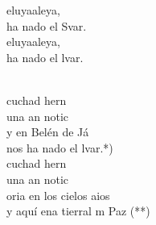 \documentclass[12pt]{article}
\begin{document}
\begin{multicols*}{2}
\begin{cancion}%
	\begin{chorus}%
	eluyaaleya,\\
	ha nado el Svar.\\
	eluyaaleya,\\
	ha nado el lvar.\\
	\end{chorus}%
	\jump\\
	cuchad hern\\
	una an notic \\
	y en Belén de Já\\
	nos ha nado el lvar.*)\\
\jump
	cuchad hern\\
	una an notic  \\
	oria en los cielos aios\\
	y aquí ena tierral m Paz (**)\\
\end{cancion}%


\end{multicols*}
\end{document}

